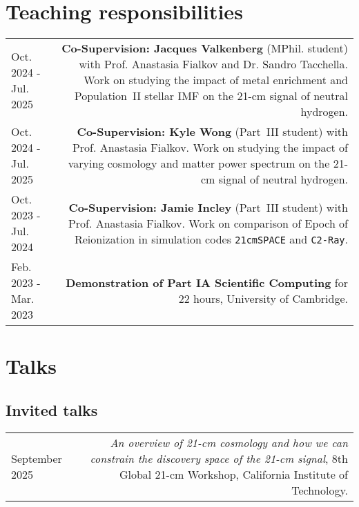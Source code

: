 \documentclass{article}
\begin{document}
\section*{Teaching responsibilities}

\begin{longtable}{L!{\vrule}R}

	Oct. 2024 - Jul. 2025 & \textbf{Co-Supervision: Jacques Valkenberg} (MPhil. student) with Prof. Anastasia Fialkov and Dr. Sandro Tacchella. Work on studying the impact of metal enrichment and Population~II stellar IMF on the 21-cm signal of neutral hydrogen. \\

	Oct. 2024 - Jul. 2025 & \textbf{Co-Supervision: Kyle Wong} (Part~III student) with Prof. Anastasia Fialkov. Work on studying the impact of varying cosmology and matter power spectrum on the 21-cm signal of neutral hydrogen. \\

	Oct. 2023 - Jul. 2024 & \textbf{Co-Supervision: Jamie Incley} (Part~III student) with Prof. Anastasia Fialkov. Work on comparison of Epoch of Reionization in simulation codes \texttt{21cmSPACE} and \texttt{C2-Ray}. \\

  Feb. 2023 - Mar. 2023 & \textbf{Demonstration of Part IA Scientific Computing} for 22 hours, University of Cambridge.\\

\end{longtable}

\section*{Talks}

\subsection*{Invited talks}

\begin{longtable}{L!{\vrule}R}

    September 2025 & \textit{An overview of 21-cm cosmology and how we can constrain the discovery space of the 21-cm signal}, 8th Global 21-cm Workshop, California Institute of Technology. \\
\end{longtable}
\end{document}
